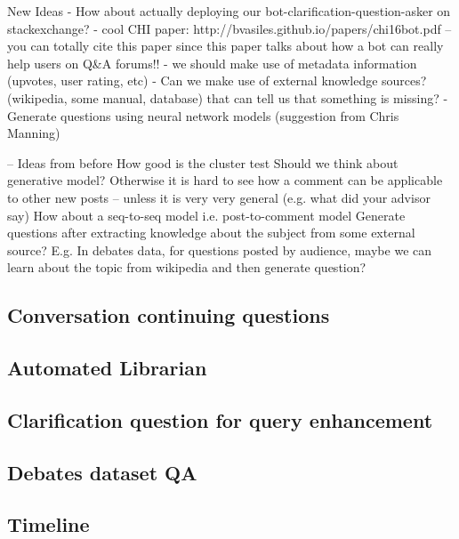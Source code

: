 \documentclass[11pt]{article}
\begin{document}
New Ideas
- How about actually deploying our bot-clarification-question-asker on stackexchange? - cool CHI paper: http://bvasiles.github.io/papers/chi16bot.pdf -- you can totally cite this paper since this paper talks about how a bot can really help users on Q&A forums!!
- we should make use of metadata information (upvotes, user rating, etc)
- Can we make use of external knowledge sources? (wikipedia, some manual, database) that can tell us that something is missing?
- Generate questions using neural network models (suggestion from Chris Manning)

-- Ideas from before
How good is the cluster test
Should we think about generative model? Otherwise it is hard to see how a comment can be applicable to other new posts -- unless it is very very general (e.g. what did your advisor say) 
How about a seq-to-seq model i.e. post-to-comment model
Generate questions after extracting knowledge about the subject from some external source? E.g. In debates data, for questions posted by audience, maybe we can learn about the topic from wikipedia and then generate question?


\subsection{Conversation continuing questions}

\subsection{Automated Librarian}

\subsection{Clarification question for query enhancement}

\subsection{Debates dataset QA}

\fi

\subsection{Timeline}

\section{}
\end{document}
